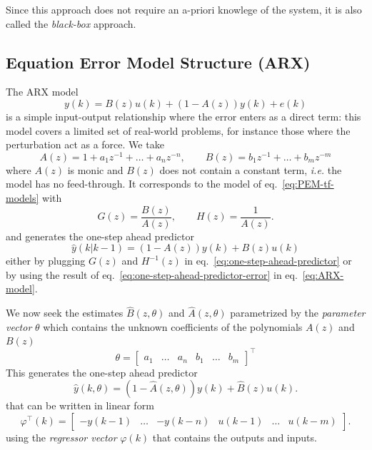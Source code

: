 Since this approach does not require an a-priori knowlege of the system, it is also called the \emph{black-box} approach.

\subsection{Equation Error Model Structure (ARX)}
\label{sec:ARX}


The ARX model
\begin{equation}
  \label{eq:ARX-model}
  y(k) = B(z)u(k) + \left(1-A(z)\right)y(k) + e(k)
\end{equation}
is a simple input-output relationship where the error enters as a direct term: this model covers a limited set of real-world problems, for instance those where the perturbation act as a force. We take
\begin{equation*}
  A(z) = 1 + a_1z^{-1} + \ldots + a_nz^{-n},\hspace{2em} B(z) = b_1z^{-1} + \ldots + b_mz^{-m}
\end{equation*}
where $A(z)$ is monic and $B(z)$ does not contain a constant term, \textit{i.e.} the model has no feed-through. It corresponds to the model of eq.~\eqref{eq:PEM-tf-models} with
\begin{equation*}
  G(z) = \frac{B(z)}{A(z)},\hspace{2em}H(z) = \frac{1}{A(z)}.
\end{equation*}
and generates the one-step ahead predictor
\begin{equation}
  \label{eq:one-step-ahead-ARX}
  \hat{y}(k|k-1) = \left(1-A(z)\right)y(k) + B(z)u(k)
\end{equation}
either by plugging $G(z)$ and $H^{-1}(z)$ in eq.~\eqref{eq:one-step-ahead-predictor} or by using the result of eq.~\eqref{eq:one-step-ahead-predictor-error} in eq.~\eqref{eq:ARX-model}.

We now seek the estimates $\hat{B}(z,\theta)$ and $\hat{A}(z,\theta)$ parametrized by the \emph{parameter vector} $\theta$ which contains the unknown coefficients of the polynomials $A(z)$ and $B(z)$
\begin{equation*}
  \theta =
  \begin{bmatrix}
    a_1 & \ldots & a_n & b_1 & \ldots & b_m
  \end{bmatrix}^\top
\end{equation*}
This generates the one-step ahead predictor
\begin{equation*}
  \hat{y}(k,\theta) = \left(1-\hat{A}(z,\theta)\right)y(k) + \hat{B}(z)u(k).
\end{equation*}
that can be written in linear form
\begin{equation*}
  \varphi^\top(k) =
  \begin{bmatrix}
    -y(k-1) & \ldots & -y(k-n) & u(k-1) & \ldots & u(k-m)
  \end{bmatrix}.
\end{equation*}
using the \emph{regressor vector} $\varphi(k)$ that contains the outputs and inputs.

